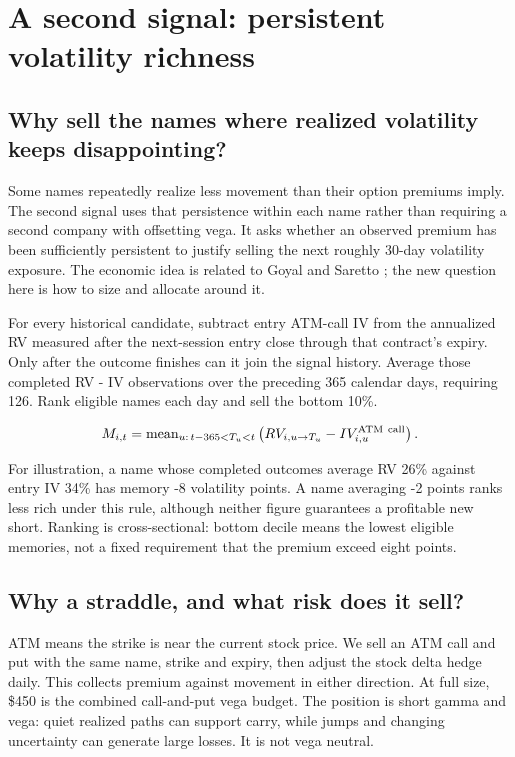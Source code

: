 \section{A second signal: persistent volatility richness}\label{sec:5}

\subsection*{Why sell the names where realized volatility keeps disappointing?}

Some names repeatedly realize less movement than their option premiums imply. The second signal uses that persistence within each name rather than requiring a second company with offsetting vega. It asks whether an observed premium has been sufficiently persistent to justify selling the next roughly 30-day volatility exposure. The economic idea is related to Goyal and Saretto \cite{goyal2009}; the new question here is how to size and allocate around it.


For every historical candidate, subtract entry ATM-call IV from the annualized RV measured after the next-session entry close through that contract's expiry. Only after the outcome finishes can it join the signal history. Average those completed RV - IV observations over the preceding 365 calendar days, requiring 126. Rank eligible names each day and sell the bottom 10\%.


\begin{equation*}M_{i,t}=\operatorname{mean}_{u:\,t-365<T_u<t}\left(RV_{i,u\to T_u}-IV^{\rm ATM\ call}_{i,u}\right).\end{equation*}

For illustration, a name whose completed outcomes average RV 26\% against entry IV 34\% has memory -8 volatility points. A name averaging -2 points ranks less rich under this rule, although neither figure guarantees a profitable new short. Ranking is cross-sectional: bottom decile means the lowest eligible memories, not a fixed requirement that the premium exceed eight points.


\subsection*{Why a straddle, and what risk does it sell?}

ATM means the strike is near the current stock price. We sell an ATM call and put with the same name, strike and expiry, then adjust the stock delta hedge daily. This collects premium against movement in either direction. At full size, \$450 is the combined call-and-put vega budget. The position is short gamma and vega: quiet realized paths can support carry, while jumps and changing uncertainty can generate large losses. It is not vega neutral.



